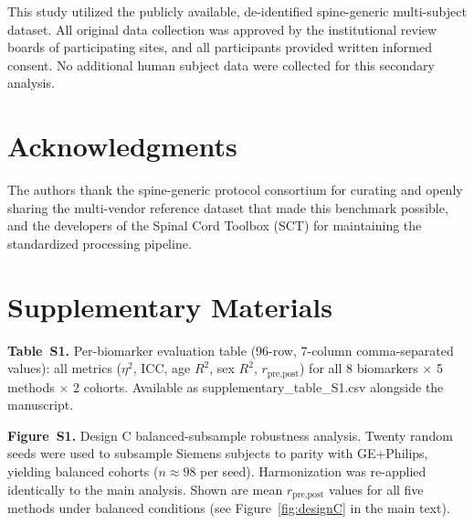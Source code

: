 \documentclass[12pt,a4paper]{article}
\begin{document}
This study utilized the publicly available, de-identified spine-generic multi-subject dataset. All original data collection was approved by the institutional review boards of participating sites, and all participants provided written informed consent. No additional human subject data were collected for this secondary analysis.

\section*{Acknowledgments}

The authors thank the spine-generic protocol consortium for curating and openly sharing the multi-vendor reference dataset that made this benchmark possible, and the developers of the Spinal Cord Toolbox (SCT) for maintaining the standardized processing pipeline.

\section*{Supplementary Materials}

\textbf{Table~S1.} Per-biomarker evaluation table (96-row, 7-column comma-separated values): all metrics ($\eta^2$, ICC, age $R^2$, sex $R^2$, $r_{\text{pre,post}}$) for all 8 biomarkers $\times$ 5 methods $\times$ 2 cohorts. Available as supplementary\_table\_S1.csv alongside the manuscript.

\textbf{Figure~S1.} Design C balanced-subsample robustness analysis. Twenty random seeds were used to subsample Siemens subjects to parity with GE+Philips, yielding balanced cohorts ($n \approx 98$ per seed). Harmonization was re-applied identically to the main analysis. Shown are mean $r_{\text{pre,post}}$ values for all five methods under balanced conditions (see Figure~\ref{fig:designC} in the main text).
\end{document}
